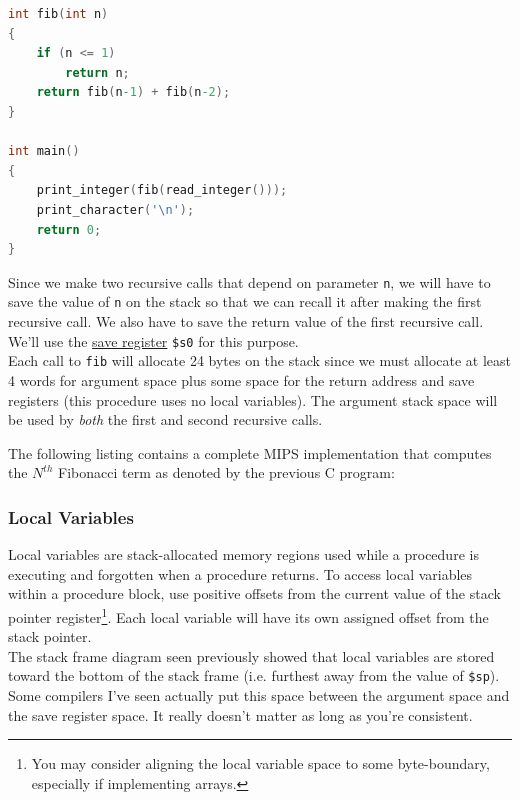 \documentclass[12pt]{article}
\begin{document}
\newpage
\begin{lstlisting}[language=C]
int fib(int n)
{
    if (n <= 1)
        return n;
    return fib(n-1) + fib(n-2);
}

int main()
{
    print_integer(fib(read_integer()));
    print_character('\n');
    return 0;
}
\end{lstlisting}

Since we make two recursive calls that depend on parameter \texttt{n}, we will
     have to save the value of \texttt{n} on the stack so that we can recall it
     after making the first recursive call. We also have to save the return
     value of the first recursive call. We'll use the
     \hyperref[sec:saveregs]{save register} \texttt{\$s0} for this purpose.\\

Each call to \texttt{fib} will allocate 24 bytes on the stack since we must
     allocate at least 4 words for argument space plus some space for the return
     address and save registers (this procedure uses no local variables). The
     argument stack space will be used by \textit{both} the first and second
     recursive calls.\\

\newpage

The following listing contains a complete MIPS implementation that computes the
     $N^{th}$ Fibonacci term as denoted by the previous C program:\\



\newpage
\subsubsection{Local Variables}

Local variables are stack-allocated memory regions used while a procedure is
     executing and forgotten when a procedure returns. To access local variables
     within a procedure block, use positive offsets from the current value of
     the stack pointer register\footnote{You may consider aligning the local
     variable space to some byte-boundary, especially if implementing
     arrays.}. Each local variable will have its own assigned offset from the
     stack pointer.\\

The stack frame diagram seen previously showed that local variables are stored
     toward the bottom of the stack frame (i.e. furthest away from the value of
     \texttt{\$sp}). Some compilers I've seen actually put this space between the
     argument space and the save register space. It really doesn't matter as
     long as you're consistent.\\
\end{document}
